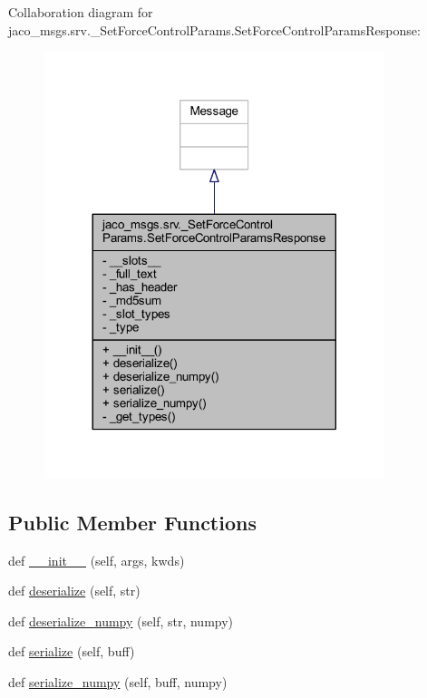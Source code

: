 Collaboration diagram for jaco\+\_\+msgs.\+srv.\+\_\+\+Set\+Force\+Control\+Params.\+Set\+Force\+Control\+Params\+Response\+:
\nopagebreak
\begin{figure}[H]
\begin{center}
\leavevmode
\includegraphics[width=281pt]{d4/d56/classjaco__msgs_1_1srv_1_1__SetForceControlParams_1_1SetForceControlParamsResponse__coll__graph}
\end{center}
\end{figure}
\subsection*{Public Member Functions}
\begin{DoxyCompactItemize}
\item 
def \hyperlink{classjaco__msgs_1_1srv_1_1__SetForceControlParams_1_1SetForceControlParamsResponse_a019b6803c0012354067bea9fefb6a61c}{\+\_\+\+\_\+init\+\_\+\+\_\+} (self, args, kwds)
\item 
def \hyperlink{classjaco__msgs_1_1srv_1_1__SetForceControlParams_1_1SetForceControlParamsResponse_a9dada58e14926ae31870ae1524fa05a1}{deserialize} (self, str)
\item 
def \hyperlink{classjaco__msgs_1_1srv_1_1__SetForceControlParams_1_1SetForceControlParamsResponse_a975fd6f3df1bffee3f7422cc2d0cb84f}{deserialize\+\_\+numpy} (self, str, numpy)
\item 
def \hyperlink{classjaco__msgs_1_1srv_1_1__SetForceControlParams_1_1SetForceControlParamsResponse_a99103e72e89ad235658a3d228fe5140b}{serialize} (self, buff)
\item 
def \hyperlink{classjaco__msgs_1_1srv_1_1__SetForceControlParams_1_1SetForceControlParamsResponse_afec68cc208c8e69d948c16908229e0f7}{serialize\+\_\+numpy} (self, buff, numpy)
\end{DoxyCompactItemize}
